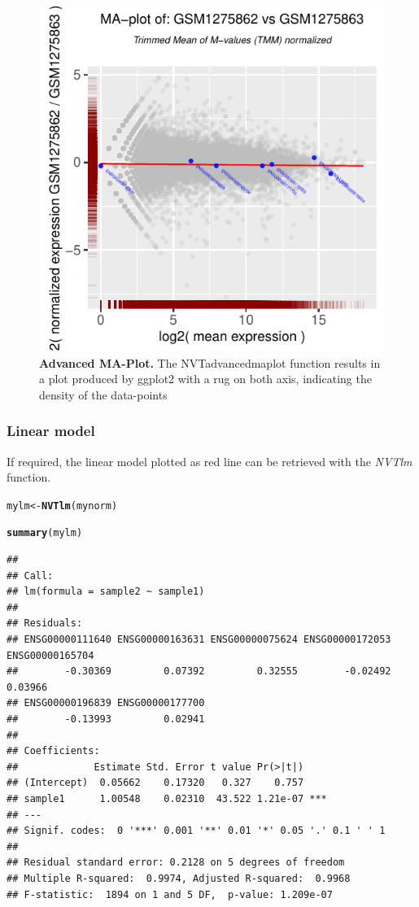 \documentclass[11pt]{article}\usepackage[]{graphicx}\usepackage[usenames,dvipsnames]{color}
\makeatletter
\newcommand{\hlstd}[1]{\textcolor[rgb]{0.345,0.345,0.345}{#1}}%
\newcommand{\hlkwb}[1]{\textcolor[rgb]{0.69,0.353,0.396}{#1}}%
\newcommand{\hlkwd}[1]{\textcolor[rgb]{0.737,0.353,0.396}{\textbf{#1}}}%
\newenvironment{kframe}{%
 \def\at@end@of@kframe{}%
 \ifinner\ifhmode%
  \def\at@end@of@kframe{\end{minipage}}%
  \begin{minipage}{\columnwidth}%
 \fi\fi%
 \def\FrameCommand##1{\hskip\@totalleftmargin \hskip-\fboxsep
 \colorbox{shadecolor}{##1}\hskip-\fboxsep
     \hskip-\linewidth \hskip-\@totalleftmargin \hskip\columnwidth}%
 \MakeFramed {\advance\hsize-\width
   \@totalleftmargin\z@ \linewidth\hsize
   \@setminipage}}%
 {\par\unskip\endMakeFramed%
 \at@end@of@kframe}
\newenvironment{knitrout}{}{} %
\makeatother
\begin{document}
\begin{figure}[!h]
\centering
\includegraphics[width=.8\textwidth]{figure/advancedmaplot-1}
\caption{
  \textbf{Advanced MA-Plot.}
  The NVTadvancedmaplot function results in a plot produced by ggplot2 with a rug on both axis, indicating the density of the data-points}
\label{fig:adMA}
\end{figure}

\newpage

\subsubsection{Linear model}

If required, the linear model plotted as red line can be retrieved with the \textit{NVTlm} function.

\begin{knitrout}
\color{fgcolor}\begin{kframe}
\begin{alltt}
\hlstd{mylm} \hlkwb{<-} \hlkwd{NVTlm}\hlstd{(mynorm)}

\hlkwd{summary}\hlstd{(mylm)}
\end{alltt}
\begin{verbatim}
## 
## Call:
## lm(formula = sample2 ~ sample1)
## 
## Residuals:
## ENSG00000111640 ENSG00000163631 ENSG00000075624 ENSG00000172053 ENSG00000165704 
##        -0.30369         0.07392         0.32555        -0.02492         0.03966 
## ENSG00000196839 ENSG00000177700 
##        -0.13993         0.02941 
## 
## Coefficients:
##             Estimate Std. Error t value Pr(>|t|)    
## (Intercept)  0.05662    0.17320   0.327    0.757    
## sample1      1.00548    0.02310  43.522 1.21e-07 ***
## ---
## Signif. codes:  0 '***' 0.001 '**' 0.01 '*' 0.05 '.' 0.1 ' ' 1
## 
## Residual standard error: 0.2128 on 5 degrees of freedom
## Multiple R-squared:  0.9974,	Adjusted R-squared:  0.9968 
## F-statistic:  1894 on 1 and 5 DF,  p-value: 1.209e-07
\end{verbatim}
\end{kframe}
\end{knitrout}
\end{document}
